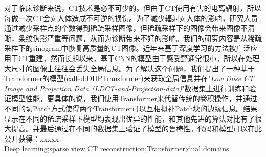 对于临床诊断来说，CT技术是必不可少的。但由于CT使用有害的电离辐射，所以每做一次CT会对人体造成不可逆的损伤。为了减少辐射对人体的影响，研究人员通过减少采样点的个数得到稀疏采样图像，但稀疏采样下的图像会带来图像不清晰，条纹伪影严重等问题，从而为诊断带来不好的影响。我们的研究内容是从稀疏采样下的sinogram中恢复高质量的CT图像。近年来基于深度学习的方法被广泛应用于CT重建，然而长期以来，基于CNN的模型由于感受野通常很小，所以在处理大尺寸的图像上往往会丢失全局信息。为了解决这个问题，我们提出了一种基于Transformer的模型(called:DDPTransformer)来获取全局信息并在"\emph{Low Dose CT Image and Projection Data (LDCT-and-Projection-data)}"数据集上进行训练和验证模型性能，更具体的说，我们使用Transformer来代替传统的卷积操作，并通过不同的切Patch方式使得两个Transformer可以互相拟补Patch块的边缘信息。结果显示在不同的稀疏采样下模型均表现出优异的性能，和其他先进的算法对比有了很大提高。并最后通过在不同的数据集上验证了模型的鲁棒性。代码和模型可以在此公开获得：xxxxx\\

Deep learning;sparse view CT reconstruction;Transformer;dual domains
